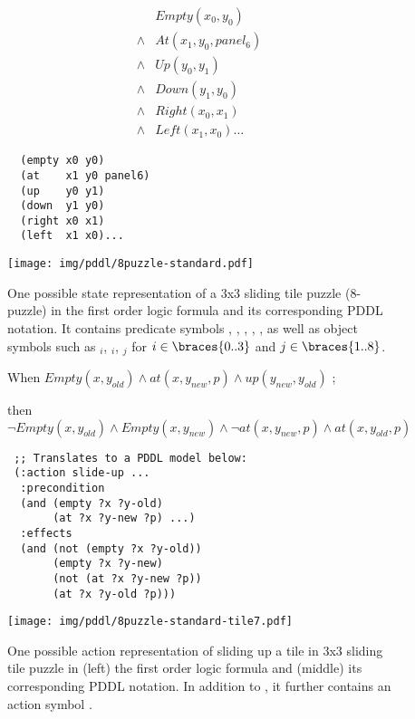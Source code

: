 \documentclass[11pt]{article}
\begin{document}
\begin{figure}[htb]
\centering
\begin{minipage}[c]{0.2\linewidth}
 \begin{align*}
        & Empty(x_0, y_0)          \\
  \land & At   (x_1, y_0, panel_6) \\
  \land & Up   (y_0, y_1)          \\
  \land & Down (y_1, y_0)          \\
  \land & Right(x_0, x_1)          \\
  \land & Left (x_1, x_0)       \ldots 
 \end{align*}
\end{minipage}
\begin{minipage}[c]{0.4\linewidth}
 \begin{verbatim}
  (empty x0 y0)
  (at    x1 y0 panel6)
  (up    y0 y1)
  (down  y1 y0)
  (right x0 x1)
  (left  x1 x0)...
 \end{verbatim}
\end{minipage}
\begin{minipage}[c]{0.3\linewidth}
 \texttt{[image: img/pddl/8puzzle-standard.pdf]}
\end{minipage}
\caption{One possible state representation of a
3x3 sliding tile puzzle (8-puzzle) in the first order logic formula and its
corresponding PDDL notation. It contains predicate symbols 
, , , , ,  as well as
object symbols such as $_i$, $_i$, $_j$ for $i \in \braces{0..3}$ and $j\in \braces{1..8}$.
}
\label{8puzzle-pddl}
\end{figure}

\begin{figure}[htb]
\begin{minipage}[c]{0.19\linewidth}
 When $Empty(x, y_{old}) \land at(x, y_{new}, p) \land up(y_{new}, y_{old})$ ;
 
 then $\lnot Empty(x,y_{old}) \land Empty(x,y_{new}) \land \lnot at(x, y_{new}, p) \land at(x, y_{old}, p)$
\end{minipage}
\begin{minipage}[c]{0.56\linewidth}
 \begin{verbatim}
 ;; Translates to a PDDL model below:
 (:action slide-up ...
  :precondition
  (and (empty ?x ?y-old)
       (at ?x ?y-new ?p) ...)
  :effects
  (and (not (empty ?x ?y-old))
       (empty ?x ?y-new)
       (not (at ?x ?y-new ?p))
       (at ?x ?y-old ?p)))
 \end{verbatim}
\end{minipage}
\begin{minipage}[c]{0.24\linewidth}
 \texttt{[image: img/pddl/8puzzle-standard-tile7.pdf]}
\end{minipage}
\caption{One possible action representation of sliding up a tile in 3x3
sliding tile puzzle in (left) the first order logic formula and (middle)
its corresponding PDDL notation. In addition to
, it further contains an action symbol
.  } \label{8puzzle-action-pddl}
\end{figure}
\end{document}
